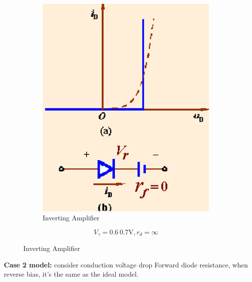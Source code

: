 \documentclass[a4paper,11pt,UTF8]{article}
\begin{document}
\begin{figure}[H]
	\begin{minipage}{.5\textwidth}
		\begin{figure}[H] 
			\centering 
			\includegraphics[scale=0.4]{./img/1.2}
			\caption{Inverting Amplifier}
		\end{figure}
	\end{minipage}
	\begin{minipage}{.29\textwidth}
		\LARGE{$$
			V_\gamma=0.6~0.7\mathrm{V}, r_d=\infty
			$$}
	\end{minipage}
\end{figure}
\textbf{Case 2 model:} consider conduction voltage drop Forward diode resistance, when reverse bias, it's the same as the ideal model.
\end{document}
